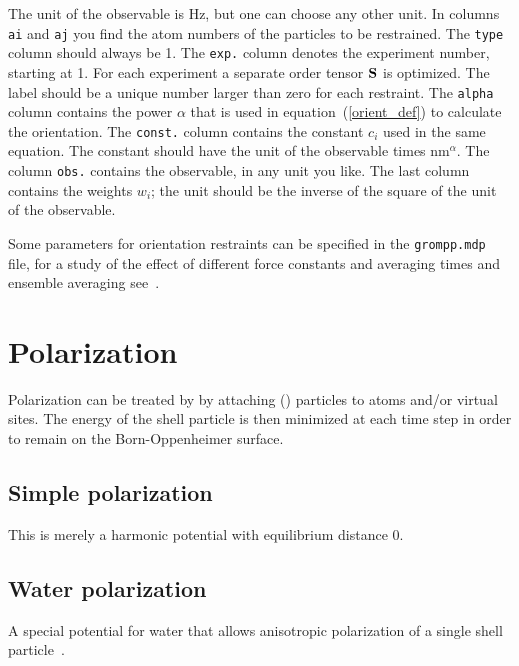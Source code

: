 The unit of the observable is Hz, but one can choose any other unit.
In columns {\tt
ai} and {\tt aj} you find the atom numbers of the particles to be
restrained. The {\tt type} column should always be 1.
The {\tt exp.} column denotes the experiment number, starting
at 1. For each experiment a separate order tensor ${\mathbf S}$
is optimized. The label should be a unique number larger than zero
for each restraint. The {\tt alpha} column contains the power $\alpha$ 
that is used in equation~(\ref{orient_def}) to calculate the orientation.
The {\tt const.} column contains the constant $c_i$ used in the same
equation. The constant should have the unit of the observable times
nm$^\alpha$. The column {\tt obs.} contains the observable, in any
unit you like. The last column contains the weights $w_i$; the unit
should be the inverse of the square of the unit of the observable.

Some parameters for orientation restraints can be specified in the
{\tt grompp.mdp} file, for a study of the effect of different
force constants and averaging times and ensemble averaging see~\cite{Hess2003}.

\section{Polarization}
Polarization can be treated by {\gromacs} by attaching
 () particles to atoms and/or
virtual sites. The energy of the shell particle is then minimized at
each time step in order to remain on the Born-Oppenheimer surface.

\subsection{Simple polarization}
This is merely a harmonic potential with equilibrium distance 0.

\subsection{Water polarization}
A special potential for water that allows anisotropic polarization of
a single shell particle~\cite{Maaren2001a}.


